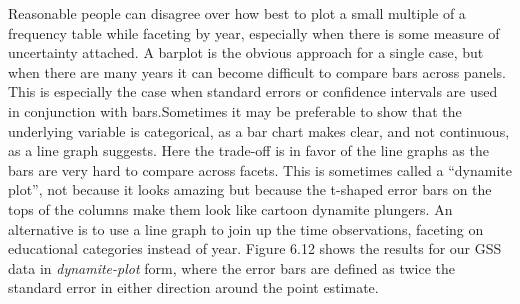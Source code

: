 \documentclass[]{book}
\begin{document}
Reasonable people can disagree over how best to plot a small multiple of a frequency table while faceting by year, especially when there is some measure of uncertainty attached. A barplot is the obvious approach for a single case, but when there are many years it can become difficult to compare bars across panels. This is especially the case when standard errors or confidence intervals are used in conjunction with bars.Sometimes it may be preferable to show that the underlying variable is categorical, as a bar chart makes clear, and not continuous, as a line graph suggests. Here the trade-off is in favor of the line graphs as the bars are very hard to compare across facets. This is sometimes called a ``dynamite plot'', not because it looks amazing but because the t-shaped error bars on the tops of the columns make them look like cartoon dynamite plungers. An alternative is to use a line graph to join up the time observations, faceting on educational categories instead of year. Figure 6.12 shows the results for our GSS data in \emph{dynamite-plot} form, where the error bars are defined as twice the standard error in either direction around the point estimate.\\
\end{document}
